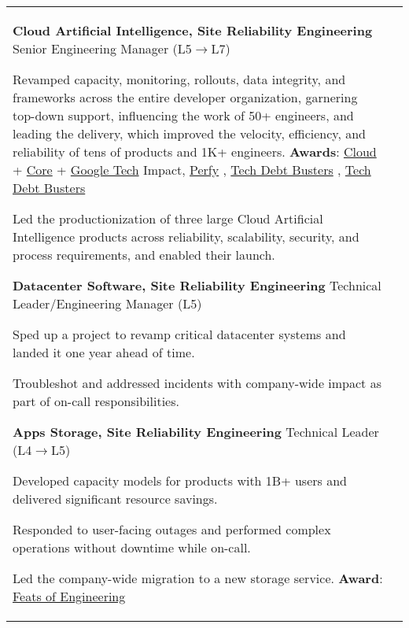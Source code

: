 \documentclass[letterpaper,10pt,oneside]{article}
\newcommand{\itemspacing}{\vspace{0.10cm}}
\newcommand{\sref}[2]{%
    \href{https://0/local/attachments/#1}{\textcolor{hiddenblue}{#2}}%
}
\newenvironment{body}
{\par\par
\begin{longtable}{p{0.145\textwidth}p{0.81\textwidth}}}
{\par\end{longtable}\par}
\begin{document}
\begin{body}
\phantom{g}\textbf{Cloud Artificial Intelligence, Site Reliability Engineering} \textemdash{ }Senior Engineering Manager (L5$\rightarrow$L7)
\begin{comp}
\item Revamped capacity, monitoring, rollouts, data integrity, and frameworks across the entire developer organization, garnering top-down support, influencing the work of 50+ engineers, and leading the delivery, which improved the velocity, efficiency, and reliability of tens of products and 1K+ engineers. \textbf{Awards}: \sref{Google-Award-GoogleCloudTechImpact-2022.pdf}{Cloud} + \sref{Google-Award-CoreTechImpact-2021.pdf}{Core} + \sref{Google-Award-GoogleTechImpact-2022.pdf}{Google Tech} Impact, \sref{Google-Award-Perfy.pdf}{Perfy}, \sref{Google-Award-TechDebtBusters1.pdf}{Tech Debt Busters}, \sref{Google-Award-TechDebtBusters2.pdf}{Tech Debt Busters}
\item Led the productionization of three large Cloud Artificial Intelligence products across reliability, scalability, security, and process requirements, and enabled their launch.
\end{comp}
\itemspacing

\phantom{g}\textbf{Datacenter Software, Site Reliability Engineering} \textemdash{ }Technical Leader/Engineering Manager (L5)
\begin{comp}
\item Sped up a project to revamp critical datacenter systems and landed it one year ahead of time.
\item Troubleshot and addressed incidents with company-wide impact as part of on-call responsibilities.
\end{comp}
\itemspacing

\phantom{g}\textbf{Apps Storage, Site Reliability Engineering} \textemdash{ }Technical Leader (L4$\rightarrow$L5)
\begin{comp}
\item Developed capacity models for products with 1B+ users and delivered significant resource savings.
\item Responded to user-facing outages and performed complex operations without downtime while on-call.
\item Led the company-wide migration to a new storage service. \textbf{Award}:\hspace{0.1cm}\sref{Google-Award-FeatsOfEngineering-2018.pdf}{Feats of Engineering}
\end{comp}
\itemspacing


\end{body}
\end{document}
